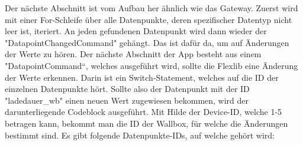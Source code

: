 Der nächste Abschnitt ist vom Aufbau her ähnlich wie das Gateway. Zuerst wird mit einer For-Schleife über alle Datenpunkte, deren spezifischer Datentyp nicht leer ist, iteriert. An jeden gefundenen Datenpunkt wird dann wieder der "DatapointChangedCommand" gehängt. Das ist dafür da, um auf Änderungen der Werte zu hören. Der nächste Abschnitt der App besteht aus einem "DatapointCommand“, welches ausgeführt wird, sollte die Flexlib eine Änderung der Werte erkennen. Darin ist ein Switch-Statement, welches auf die ID der einzelnen Datenpunkte hört. Sollte also der Datenpunkt mit der ID "ladedauer\_wb" einen neuen Wert zugewiesen bekommen, wird der darunterliegende Codeblock ausgeführt. Mit Hilde der Device-ID, welche 1-5 betragen kann, bekommt man die ID der Wallbox, für welche die Änderungen bestimmt sind. Es gibt folgende Datenpunkte-IDs, auf welche gehört wird:  

